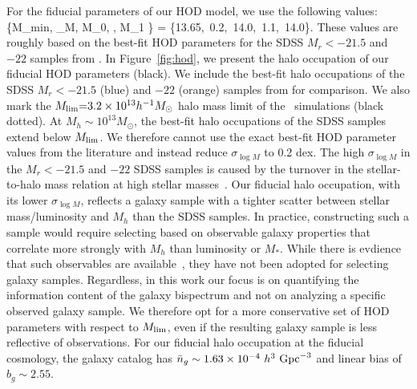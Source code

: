For the fiducial parameters of our HOD model, we use the following values: 
\beq \label{eq:hod_fid}
\{M_{\rm min}, \sigma_{\log M}, \log M_0, \alpha, \log M_1 \} = \{13.65,~0.2,~14.0,~1.1,~14.0\}.
\eeq
These values are roughly based on the best-fit HOD parameters for the SDSS $M_r
< -21.5$ and $-22$ samples from \cite{zheng2007}. 
In Figure~\ref{fig:hod}, we present the halo occupation of our fiducial 
HOD parameters (black). We include the best-fit halo occupations of 
the SDSS $M_r < -21.5$ (blue)  and $-22$ (orange) samples from \cite{zheng2007}
for comparison. We also mark the  $M_{\rm lim}{=}3.2\times10^{13} h^{-1}M_\odot$ 
halo mass limit of the \quij~simulations (black dotted). At $M_h \sim 10^{13} M_\odot$, 
the best-fit halo occupations of the SDSS samples extend below $M_{\rm lim}$. We 
therefore cannot use the exact best-fit HOD
parameter values from the literature and instead reduce $\sigma_{\log M}$ to 0.2 dex.
The high $\sigma_{\log M}$ in the $M_r < -21.5$ and $-22$ SDSS samples is
caused by the turnover in the stellar-to-halo mass relation at high stellar
masses~\citep{mandelbaum2006a, conroy2007, more2011, leauthaud2012, tinker2013,
zu2015, hahn2019a}. Our fiducial halo occupation, with its lower $\sigma_{\log
M}$, reflects a galaxy sample with a tighter scatter between stellar
mass/luminosity and $M_h$ than the SDSS samples.  %
In practice, constructing such a sample would require selecting based on
observable galaxy properties that correlate more strongly with $M_h$ than 
luminosity or $M_*$. While there is evdience that such observables are 
available~\citep[\eg~$L_{\rm sat}$; ][]{alpaslan2019}, they have not been
adopted for selecting galaxy samples. Regardless, in this work
our focus is on quantifying the information content of the galaxy bispectrum 
and not on analyzing a specific observed galaxy sample. We therefore opt for 
a more conservative set of HOD parameters with respect to $M_{\rm lim}$, even
if the resulting galaxy sample is less reflective of observations. For our
fiducial halo occupation at the fiducial cosmology, the galaxy catalog has 
$\bar{n}_g \sim 1.63\times 10^{-4}~h^3~{\rm Gpc}^{-3}$ and linear bias of 
$b_g \sim 2.55$.

